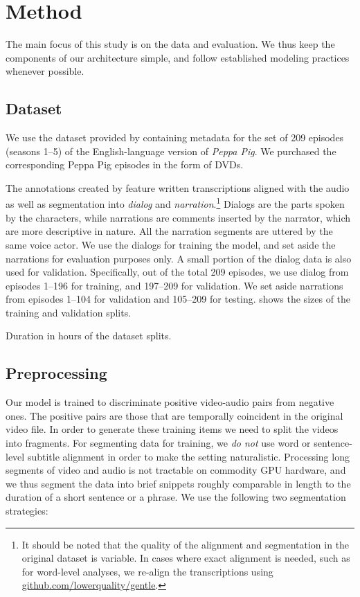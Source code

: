 \section{Method}
\label{sec:method}

The main focus of this study is on the data and evaluation. We thus
keep the components of our architecture simple, and follow established
modeling practices whenever possible.

\subsection{Dataset}
We use the dataset provided by \citet{papasarantopoulos2021narration}
containing metadata for the set of 209 episodes (seasons 1--5) of the
English-language version of {\it Peppa Pig}. We purchased the
corresponding Peppa Pig episodes in the form of DVDs. 

The annotations created by  \citet{papasarantopoulos2021narration}
feature written transcriptions aligned with the
audio as well as segmentation into {\it dialog} and {\it
  narration}.\footnote{It should be noted that the quality of the
  alignment and segmentation in the original dataset is variable. In
  cases where exact alignment is needed, such as for word-level
  analyses, we re-align the transcriptions using
  \url{github.com/lowerquality/gentle}.}  Dialogs are the parts spoken
by the characters, while narrations are comments inserted by the
narrator, which are more descriptive in nature. All the narration
segments are uttered by the same voice actor. We use the dialogs for
training the model, and set aside the narrations for evaluation
purposes only. A small portion of the dialog data is also used for
validation.  Specifically, out of the total 209 episodes, we use
dialog from episodes 1--196 for training, and 197--209 for
validation. We set aside narrations from episodes 1--104 for
validation and 105--209 for testing. 
shows the sizes of the training and validation splits.

\begin{table}[htb]
  \centering 
  \caption{Duration in hours of the dataset splits.}
  \label{tab:ds-stat}
\end{table}


\subsection{Preprocessing}
Our model is trained to discriminate positive video-audio pairs from
negative ones.  The positive pairs are those that are temporally
coincident in the original video file. In order to generate these
training items we need to split the videos into fragments.  For
segmenting data for training, we \emph{do not} use word or
sentence-level subtitle alignment in order to make the setting
naturalistic. Processing long segments of video and audio is not
tractable on commodity GPU hardware, and we thus segment the data into
brief snippets roughly comparable in length to the duration of a short
sentence or a phrase. We use the following two segmentation
strategies:

